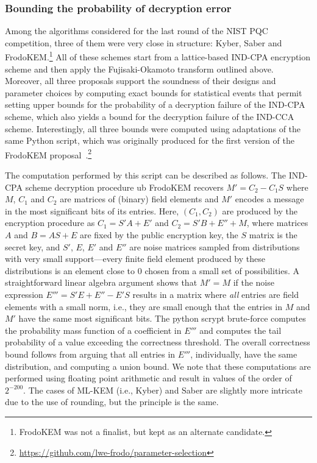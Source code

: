 \documentclass[conference,compsoc]{IEEEtran}
\begin{document}
\subsubsection*{Bounding the probability of decryption error} 
Among the algorithms considered for the last round of the NIST PQC competition, three of them were very close in structure: Kyber, Saber and FrodoKEM.\footnote{FrodoKEM was not a finalist, but kept as an alternate candidate.}
All of these schemes start from a lattice-based IND-CPA encryption scheme and then apply the Fujisaki-Okamoto transform outlined above. Moreover, all three proposals support the soundness of their designs and parameter choices by computing exact bounds for statistical events that permit setting upper bounds for the probability of a decryption failure of the IND-CPA scheme, which also yields a bound for the decryption failure of the IND-CCA scheme.
Interestingly, all three bounds were computed using adaptations of the same Python script, which was originally produced for the first version of the FrodoKEM proposal~\cite{CCS:BCDMNN16}.\footnote{\url{https://github.com/lwe-frodo/parameter-selection}}

The computation performed by this script can be described as follows.
The IND-CPA scheme decryption procedure ub FrodoKEM recovers $M' = C_2 - C_1S$ where $M$, $C_1$ and $C_2$ are matrices of (binary) field elements and $M'$ encodes a message in the most significant bits of its entries. Here, $(C_1,C_2)$ are produced by the encryption procedure as $C_1 = S'A+E'$ and $C_2 = S'B+E'' + M$, where matrices $A$ and $B=AS+E$ are fixed by the public encryption key, the $S$ matrix is the secret key, and $S'$, $E$, $E'$ and $E''$ are noise matrices sampled from distributions with very small support---every finite field element produced by these distributions is an element close to $0$ chosen from a small set of possibilities. A straightforward linear algebra argument shows that $M'=M$ if the noise expression $E'''=S'E+E''-E'S$ results in a matrix where {\em all} entries are field elements with a small norm, i.e., they are small enough that the entries in $M$ and $M'$ have the same most significant bits.
The python scrypt brute-force computes the probability mass function of a coefficient in $E'''$ and computes the tail probability of a value exceeding the correctness threshold. The overall correctness bound follows from arguing that all entries in $E'''$, individually, have the same distribution, and computing a union bound. We note that these computations are performed using floating point arithmetic and result in values of the order of $2^{-200}$. 
The cases of ML-KEM (i.e., Kyber) and Saber are slightly more intricate due to the use of rounding, but the principle is the same.
\end{document}
